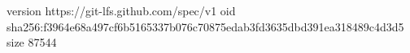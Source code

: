 version https://git-lfs.github.com/spec/v1
oid sha256:f3964e68a497cf6b5165337b076c70875edab3fd3635dbd391ea318489c4d3d5
size 87544
